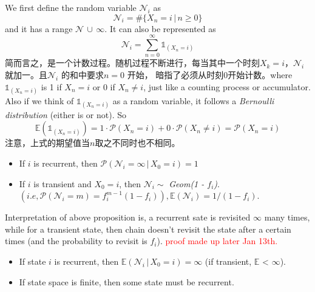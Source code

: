 \documentclass[10.5pt]{article}
\newcommand{\prob}[0]{\mathcal{P}}
\newenvironment{changemargin}[2]{%
  \begin{list}{}{%
    \setlength{\topsep}{0pt}%
    \setlength{\leftmargin}{#1}%
    \setlength{\rightmargin}{#2}%
    \setlength{\listparindent}{\parindent}%
    \setlength{\itemindent}{\parindent}%
    \setlength{\parsep}{\parskip}%
  }%
  \item[]}{\end{list}}
\begin{document}
\begin{changemargin}{-0.125in}{0in}
\begin{enumerate}
\begin{enumerate}
       We first define the random variable $\mathcal{N}_i$ as
       \[
       \mathcal{N}_i = \# \{X_n = i\,|\, n \geq 0\}
       \]
       and it has a range $\mathcal{N} \, \cup \, \infty$. It can also be represented as 
       \[
       \mathcal{N}_i = \sum_{n = 0}^\infty \mathbb{1}_{(X_n = i)}
       \]
       简而言之，是一个计数过程。随机过程不断进行，每当其中一个时刻$X_k =i $，$\mathcal{N}_i$就加一。且$\mathcal{N}_i$ 的和中要求$n =0$ 开始， 暗指了必须从时刻0开始计数。where $\mathbb{1}_{(X_n = i)}$ is 1 if $X_n = i$ or 0 if $X_n \neq i$, just like a counting process or accumulator. Also if we think of $\mathbb{1}_{(X_n = i)}$ as a random variable, it follows a \textit{Bernoulli distribution} (either is or not). So 
       \[
       \mathbb{E}(\mathbb{1}_{(X_n = i)}) = 1 \cdot \prob(X_n = i) + 0 \cdot \prob(X_n \neq i) = \prob(X_n = i)
       \] 
       注意，上式的期望值当$n$取之不同时也不相同。
       
       \medskip
       
       \begin{proposition}
       	 \begin{itemize}
       	 
       	 	\item If $i$ is recurrent, then $\prob(\mathcal{N}_i = \infty\,|\,X_0=i) = 1$
       	 	
       	 	\medskip
       	 	
       	 	\item If $i$ is transient and $X_0 = i$, then $\mathcal{N}_i \sim$ \textit{Geom(1 - $f_i$)}. $(i.e,\prob(\mathcal{N}_i = m) = f_i^{m-1}(1 - f_i)), \mathbb{E}(\mathcal{N}_i) = 1/(1 - f_i)$.
       	 \end{itemize}
       \end{proposition}
       
       
       \medskip
       
       Interpretation of above proposition is, a recurrent sate is revisited $\infty$ many times, while for a transient state, then chain doesn't revisit the state after a certain times (and the probability to revisit is $f_i$). \textcolor{red}{proof made up later Jan 13th.}
       
       
       \medskip
       
       \begin{remark}
       	 \begin{itemize}
       	 	\item If state $i$ is recurrent, then $\mathbb{E}(\mathcal{N}_i \,|\, X_0 = i) = \infty$ (if transient, $\mathbb{E}$ < $\infty$).
       	 	\item If state space is finite, then some state must be recurrent. 
       	 \end{itemize}
       \end{remark}
       

\end{enumerate}
\end{enumerate}
\end{changemargin}
\end{document}
